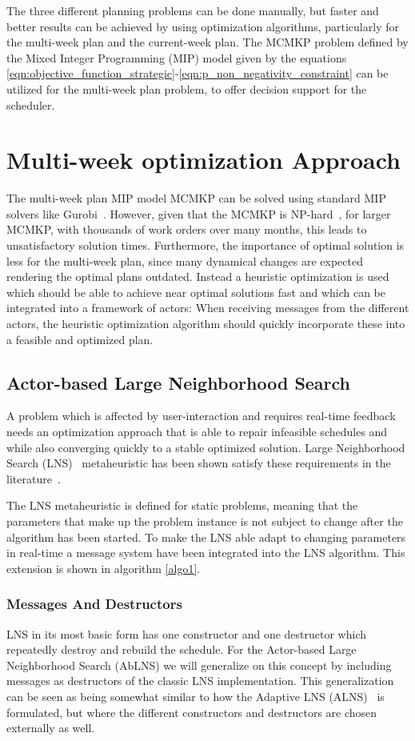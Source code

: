 \documentclass[preprint,12pt,authoryear]{elsarticle}
\begin{document}
The three different planning problems can be done manually, but faster and better results can be achieved by using optimization algorithms, particularly for the multi-week plan and the current-week plan. The MCMKP problem defined by the Mixed Integer Programming (MIP) model given by the equations \eqref{eqn:objective_function_strategic}-\eqref{eqn:p_non_negativity_constraint} can be utilized for the multi-week plan problem, to offer decision support for the scheduler.

\section{Multi-week optimization Approach}
\label{sec:2-solution-method}
The multi-week plan MIP model MCMKP can be solved using standard MIP solvers like Gurobi~\cite{???}. However, given that the MCMKP is NP-hard~\cite{???}, for larger MCMKP, with thousands of work orders over many months, this leads to unsatisfactory solution times. Furthermore, the importance of optimal solution is less for the multi-week plan, since many dynamical changes are expected rendering the optimal plans outdated. Instead a heuristic optimization is used which should be able to achieve near optimal solutions fast and which can be integrated into a framework of actors: When receiving messages from the different actors, the heuristic optimization algorithm should quickly incorporate these into a feasible and optimized plan.

\subsection{Actor-based Large Neighborhood Search}
A problem which is affected by user-interaction and requires real-time feedback needs an optimization approach that is able to repair infeasible schedules and while also converging quickly to a stable optimized solution. Large Neighborhood Search (LNS)~\cite{shaw1998using} metaheuristic has been shown satisfy these requirements in the literature~\cite{gendreau_handbook_2019}. 

The LNS metaheuristic is defined for static problems, meaning that the parameters that make up the problem instance is not subject to change after the algorithm has been started. To make the LNS able adapt to changing parameters in real-time a message system have been integrated into the LNS algorithm. This extension is shown in algorithm \ref{algo1}.  

\subsubsection{Messages And Destructors}
LNS in its most basic form has one constructor and one destructor which repeatedly destroy and rebuild the schedule. For the Actor-based Large Neighborhood Search (AbLNS) we will generalize on this concept by including messages as destructors of the classic LNS implementation. This generalization can be seen as being somewhat similar to how the Adaptive LNS (ALNS)~\cite{ropke2006adaptive} is formulated, but where the different constructors and destructors are chosen externally as well. 
\end{document}
